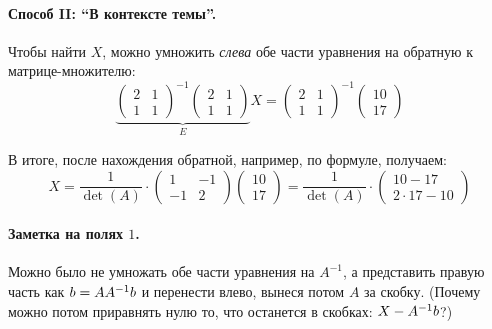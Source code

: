 \documentclass[a4paper,12pt]{article}
\begin{document}
\begin{solution}
    
    \medskip
    
    \paragraph{Способ II: ``В контексте темы''.}

    Чтобы найти $X$, можно умножить \emph{слева} обе части уравнения на обратную к матрице-множителю:
    \[
    \underbrace{\begin{pmatrix}
      2 & 1\\
      1 & 1
    \end{pmatrix}^{-1}
    \begin{pmatrix}
      2 & 1\\
      1 & 1
    \end{pmatrix}}_{E} X = \begin{pmatrix}
      2 & 1\\
      1 & 1
    \end{pmatrix}^{-1}
    \begin{pmatrix}
      10\\
      17
    \end{pmatrix}
  \]
  
  В итоге, после нахождения обратной, например, по формуле, получаем:
  \[
    X = \frac{1}{\det(A)} \cdot \begin{pmatrix}
      1 & -1\\
      -1 & 2
    \end{pmatrix}
    \begin{pmatrix}
      10\\
      17
    \end{pmatrix}
    = \frac{1}{\det(A)} \cdot \begin{pmatrix}
      10 - 17\\
      2 \cdot 17 - 10
    \end{pmatrix}
  \]
  \end{solution}
  
  
  \bigskip
  
  \paragraph{Заметка на полях $1$.}
  
  Можно было не умножать обе части уравнения на $A^{-1}$, а представить правую часть как $b \hm= AA^{-1}b$ и перенести влево, вынеся потом $A$ за скобку. (Почему можно потом приравнять нулю то, что останется в скобках: $X \hm- A^{-1}b$?)
  
  \medskip
  
\end{document}
